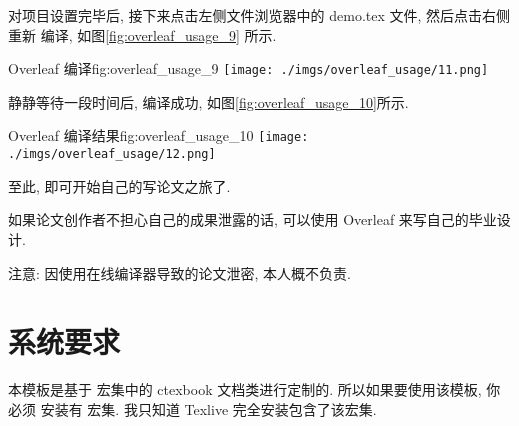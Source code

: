 \documentclass[bibsec, doctor, tabtoc, figtoc]{cugthesis}
\begin{document}
对项目设置完毕后, 接下来点击左侧文件浏览器中的 demo.tex 文件, 然后点击右侧重新
编译, 如图\ref{fig:overleaf_usage_9} 所示.

\begin{tfig}{Overleaf   编译}{fig:overleaf_usage_9}
\texttt{[image: ./imgs/overleaf\_usage/11.png]}
\end{tfig}

静静等待一段时间后, 编译成功, 如图\ref{fig:overleaf_usage_10}所示.

\begin{tfig}{Overleaf   编译结果}{fig:overleaf_usage_10}
\texttt{[image: ./imgs/overleaf\_usage/12.png]}
\end{tfig}

至此, 即可开始自己的写论文之旅了.

如果论文创作者不担心自己的成果泄露的话, 可以使用 Overleaf 来写自己的毕业设计.

注意: 因使用在线编译器导致的论文泄密, 本人概不负责.

\section{系统要求}
\label{sec:xi_tong_yao_qiu_}
本模板是基于 \CTeX{} 宏集中的 ctexbook 文档类进行定制的. 所以如果要使用该模板, 你必须
安装有 \CTeX{} 宏集. 我只知道 Texlive 完全安装包含了该宏集.
\end{document}
